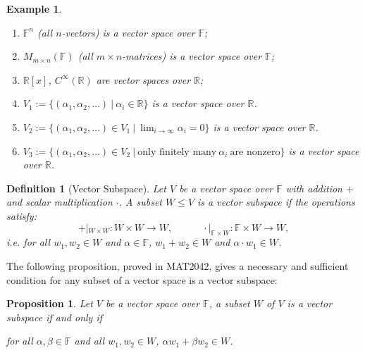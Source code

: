 \documentclass[12pt]{amsbook}
\newtheorem{definition}[theorem]{Definition}
\newtheorem{example}[theorem]{Example}
\newtheorem{proposition}[theorem]{Proposition}
\begin{document}
\begin{example} \label{eg-v123}
    
    \begin{enumerate}
        \item $\mathbb{F}^n$ (all $n$-vectors) is a vector space over $\mathbb{F}$; 
        \item $M_{m \times n}(\mathbb{F})$ (all $m \times n$-matrices) is a vector space over $\mathbb{F}$;
        \item $\mathbb{R}[x]$, $C^{\infty}(\mathbb{R})$ are vector spaces over $\mathbb{R}$;
        \item $V_1 := \{(\alpha_1,\alpha_2,\dots)\ |\ \alpha_i \in \mathbb{R}\}$ is a vector space over $\mathbb{R}$.
        \item $V_2 := \{(\alpha_1,\alpha_2,\dots) \in V_1 \ |\ \lim_{i \to \infty} \alpha_i  = 0\}$ is a vector space over $\mathbb{R}$.
        \item $V_3 := \{(\alpha_1,\alpha_2,\dots) \in V_2 \ |\ \text{only finitely many}\ \alpha_i\ \text{are nonzero}\}$ is a vector space over $\mathbb{R}$.
    \end{enumerate}
\end{example}

\begin{definition}[Vector Subspace]
    Let $V$ be a vector space over $\mathbb{F}$ with addition $+$ and scalar multiplication $\cdot$. A subset $W \leq V$ is a vector subspace if the operations satisfy:
    $$+|_{W \times W}: W \times W \to W, \quad \quad \quad \cdot|_{\mathbb{F} \times W}: \mathbb{F} \times W \to W,$$
    i.e. for all $w_1, w_2 \in W$ and $\alpha \in \mathbb{F}$, $w_1 + w_2 \in W$ and $\alpha \cdot w_1 \in W$.
\end{definition}

The following proposition, proved in MAT2042, gives a necessary and sufficient condition for any subset of a vector space is a vector subspace:
\begin{proposition}
    Let $V$ be a vector space over $\mathbb{F}$, a subset $W$ of $V$ is a vector subspace if and only if
    \begin{center}
        for all $\alpha, \beta \in \mathbb{F}$ and all $w_1, w_2 \in W$, $\alpha w_1 + \beta w_2 \in W$.
    \end{center}
\end{proposition}
\end{document}
